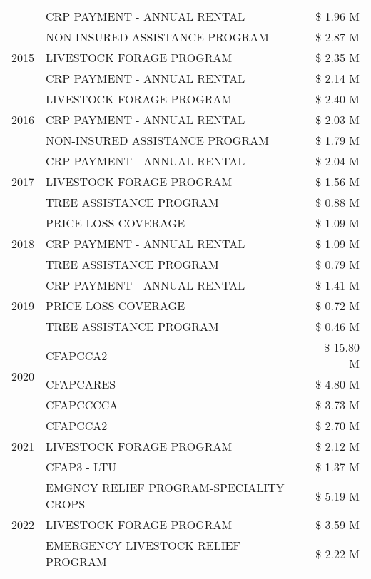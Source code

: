 \begin{tabular}{llr}
 & CRP PAYMENT - ANNUAL RENTAL & \$ 1.96 M \\
\cline{1-3}
\multirow[t]{3}{*}{2015} & NON-INSURED ASSISTANCE PROGRAM & \$ 2.87 M \\
 & LIVESTOCK FORAGE PROGRAM & \$ 2.35 M \\
 & CRP PAYMENT - ANNUAL RENTAL & \$ 2.14 M \\
\cline{1-3}
\multirow[t]{3}{*}{2016} & LIVESTOCK FORAGE PROGRAM & \$ 2.40 M \\
 & CRP PAYMENT - ANNUAL RENTAL & \$ 2.03 M \\
 & NON-INSURED ASSISTANCE PROGRAM & \$ 1.79 M \\
\cline{1-3}
\multirow[t]{3}{*}{2017} & CRP PAYMENT - ANNUAL RENTAL & \$ 2.04 M \\
 & LIVESTOCK FORAGE PROGRAM & \$ 1.56 M \\
 & TREE ASSISTANCE PROGRAM & \$ 0.88 M \\
\cline{1-3}
\multirow[t]{3}{*}{2018} & PRICE LOSS COVERAGE & \$ 1.09 M \\
 & CRP PAYMENT - ANNUAL RENTAL & \$ 1.09 M \\
 & TREE ASSISTANCE PROGRAM & \$ 0.79 M \\
\cline{1-3}
\multirow[t]{3}{*}{2019} & CRP PAYMENT - ANNUAL RENTAL & \$ 1.41 M \\
 & PRICE LOSS COVERAGE & \$ 0.72 M \\
 & TREE ASSISTANCE PROGRAM & \$ 0.46 M \\
\cline{1-3}
\multirow[t]{3}{*}{2020} & CFAPCCA2 & \$ 15.80 M \\
 & CFAPCARES & \$ 4.80 M \\
 & CFAPCCCCA & \$ 3.73 M \\
\cline{1-3}
\multirow[t]{3}{*}{2021} & CFAPCCA2 & \$ 2.70 M \\
 & LIVESTOCK FORAGE PROGRAM & \$ 2.12 M \\
 & CFAP3 - LTU & \$ 1.37 M \\
\cline{1-3}
\multirow[t]{3}{*}{2022} & EMGNCY RELIEF PROGRAM-SPECIALITY CROPS & \$ 5.19 M \\
 & LIVESTOCK FORAGE PROGRAM & \$ 3.59 M \\
 & EMERGENCY LIVESTOCK RELIEF PROGRAM & \$ 2.22 M \\
\cline{1-3}
\bottomrule
\end{tabular}
